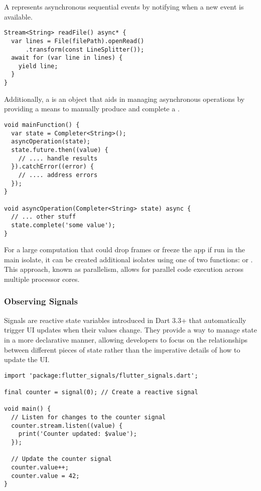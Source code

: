 \noindent A  represents asynchronous sequential events by notifying when a new event is available.

\begin{lstlisting}
Stream<String> readFile() async* {
  var lines = File(filePath).openRead()
      .transform(const LineSplitter());
  await for (var line in lines) {
    yield line;
  }
}
\end{lstlisting}

\noindent Additionally, a  is an object that aids in managing asynchronous operations by providing a means
to manually produce and complete a .

\begin{lstlisting}
void mainFunction() {
  var state = Completer<String>();
  asyncOperation(state);
  state.future.then((value) {
    // .... handle results
  }).catchError((error) {
    // .... address errors
  });
}

void asyncOperation(Completer<String> state) async {
  // ... other stuff
  state.complete('some value');
}
\end{lstlisting}

\noindent For a large computation that could drop frames or freeze the app if run in the main isolate, it can be
created additional isolates using one of two functions:  or . This approach, known as
parallelism, allows for parallel code execution across multiple processor cores.


\subsubsection{Observing Signals}

Signals are reactive state variables introduced in Dart 3.3+ that automatically trigger UI updates when their values
change. They provide a way to manage state in a more declarative manner, allowing developers to focus on the
relationships between different pieces of state rather than the imperative details of how to update the UI.

\begin{lstlisting}
import 'package:flutter_signals/flutter_signals.dart';

final counter = signal(0); // Create a reactive signal

void main() {
  // Listen for changes to the counter signal
  counter.stream.listen((value) {
    print('Counter updated: $value');
  });

  // Update the counter signal
  counter.value++;
  counter.value = 42;
}
\end{lstlisting}

